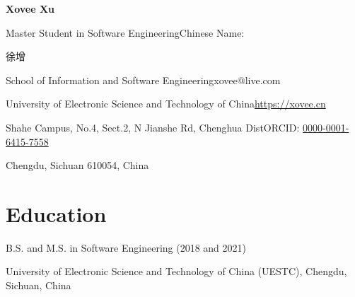 \documentclass{article}
\begin{document}
\begin{center}
    \Huge{
    \textbf{Xovee Xu}}
\end{center}



\noindent Master Student in Software Engineering\hfill Chinese Name: \begin{CJK*}{UTF8}{gkai}徐增\end{CJK*}

\noindent School of Information and Software Engineering\hfill xovee@live.com

\noindent University of Electronic Science and Technology of China\hfill \url{https://xovee.cn}

\noindent Shahe Campus, No.4, Sect.2, N Jianshe Rd, Chenghua Dist\hfill ORCID: \href{https://orcid.org/0000-0001-6415-7558}{0000-0001-6415-7558}

\noindent Chengdu, Sichuan 610054, China

\setlength{\parskip}{3pt}


\vspace{-8pt}
\section*{Education}
\vspace{-4pt}
\indent 


B.S. and M.S. in Software Engineering (2018 and 2021)

University of Electronic Science and Technology of China (UESTC), Chengdu, Sichuan, China






\end{document}
